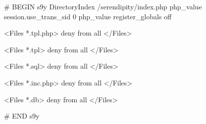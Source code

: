 \begin{ospcode}
# BEGIN s9y
DirectoryIndex /serendipity/index.php
php_value session.use_trans_sid 0
php_value register_globals off

<Files *.tpl.php>
    deny from all
</Files>

<Files *.tpl>
    deny from all
</Files>

<Files *.sql>
    deny from all
</Files>

<Files *.inc.php>
    deny from all
</Files>

<Files *.db>
    deny from all
</Files>

# END s9y
\end{ospcode}